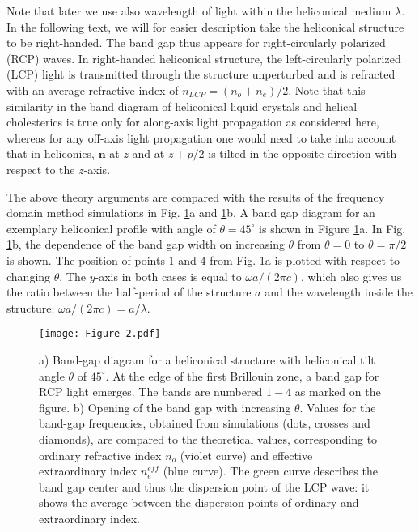 \documentclass{osa-article}
\renewcommand{\vec}[1]{\mathbf{#1}}
\begin{document}
Note that later we use also wavelength of light within the heliconical medium $\lambda$. 
In the following text, we will for easier description take the heliconical structure to be right-handed.
The band gap thus appears for right-circularly polarized (RCP) waves. 
In right-handed heliconical structure, the left-circularly polarized (LCP) light is transmitted through the structure unperturbed 
and is refracted with an average refractive index of $n_{LCP}=(n_o+n_e)/2$.
Note that this similarity in the band diagram of heliconical liquid crystals and helical cholesterics is true only for along-axis light propagation as considered here,
whereas for any off-axis light propagation one would need to take into account that in heliconics, 
$\vec{n}$ at $z$ and at $z+p/2$ is tilted in the opposite direction with respect to the $z$-axis.

The above theory arguments are compared with the results of the frequency domain method simulations in Fig. \ref{fig:eff-bg}a and \ref{fig:eff-bg}b. 
A band gap diagram for an exemplary heliconical profile with angle of $\theta=45^\circ$ is shown in Figure \ref{fig:eff-bg}a. 
In Fig. \ref{fig:eff-bg}b, the dependence of the band gap width on increasing $\theta$ from $\theta=0$ to $\theta=\pi/2$ is shown. 
The position of points $1$ and $4$ from Fig. \ref{fig:eff-bg}a is plotted with respect to changing $\theta$. 
The $y$-axis in both cases is equal to $\omega a / (2 \pi c)$, which also gives us the ratio between the half-period of the structure $a$ and the wavelength inside the structure: 
$\omega a / (2 \pi c) = a/\lambda$. 

\begin{figure}[h!]
  \centering
  \texttt{[image: Figure-2.pdf]}
  \caption{a) Band-gap diagram for a heliconical structure with heliconical tilt angle $\theta$ of $45^\circ$. 
  At the edge of the first Brillouin zone, a band gap for RCP light emerges. 
  The bands are numbered $1-4$ as marked on the figure. 
  b) Opening of the band gap with increasing $\theta$. 
  Values for the band-gap frequencies, obtained from simulations (dots, crosses and diamonds), are compared to the theoretical values, corresponding to ordinary refractive index $n_o$ (violet curve)
  and effective extraordinary index $n_e^{eff}$ (blue curve). 
  The green curve describes the band gap center and thus the dispersion point of the LCP wave: 
  it shows the average between the dispersion points of ordinary and extraordinary index. 
  }
  \label{fig:eff-bg}
\end{figure}
\end{document}
